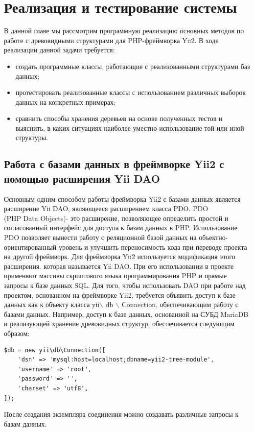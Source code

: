 \documentclass[a4paper,14pt]{extreport}
\theoremstyle{definition}
\begin{document}
\chapter{Реализация и тестирование системы}
В данной главе мы рассмотрим программную реализацию основных методов по работе с древовидными структурами для PHP-фреймворка Yii2. В ходе реализации данной задачи требуется:
\begin{itemize}
\item создать программные классы, работающие с реализованными структурами баз данных;
\item протестировать реализованные классы с использованием различных выборок данных на конкретных примерах;
\item сравнить способы хранения деревьев на основе полученных тестов и выяснить, в каких ситуациях наиболее уместно использование той или иной структуры.
\end{itemize}
\section{Работа с базами данных в фреймворке Yii2 с помощью расширения Yii DAO}
Основным одним способом работы фреймворка Yii2 с базами данных является расширение Yii DAO, являющееся расширением класса PDO.
PDO\\(PHP Data Objects)- это расширение, позволяющее определить простой и согласованный интерфейс для доступа к базам данных в PHP. Использование PDO позволяет вынести работу с реляционной базой данных на объектно-ориентированный уровень и улучшить переносимость кода при переводе проекта на другой фреймворк.
Для фреймворка Yii2 используется модификация этого расширения. которая называется Yii DAO. При его использовании в проекте применяют массивы скриптового языка программирования PHP и прямые запросы к базе данных SQL.
Для того, чтобы использовать DAO при работе над проектом, основанном на фреймворке Yii2, требуется объявить доступ к базе данных как к объекту класса yii$\backslash$ db $\backslash$ Connection, обеспечивающим работу с базами данных. Например, доступ к базе данных, основанной на СУБД MariaDB и реализующей хранение древовидных структур, обеспечивается следующим образом:
\begin{verbatim}
$db = new yii\db\Connection([
    'dsn' => 'mysql:host=localhost;dbname=yii2-tree-module',
    'username' => 'root',
    'password' => '',
    'charset' => 'utf8',
]);
\end{verbatim}
После создания экземпляра соединения можно создавать различные запросы к базам данных.
\end{document}
